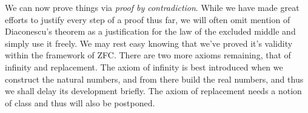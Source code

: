         We can now prove things via \textit{proof by contradiction}. While we
        have made great efforts to justify every step of a proof thus far, we
        will often omit mention of Diaconescu's theorem as a justification for
        the law of the excluded middle and simply use it freely. We may rest
        easy knowing that we've proved it's validity within the framework of
        ZFC. There are two more axioms remaining, that of infinity and
        replacement. The axiom of infinity is best introduced when we construct
        the natural numbers, and from there build the real numbers, and thus we
        shall delay its development briefly. The axiom of replacement needs a
        notion of class and thus will also be postponed.
